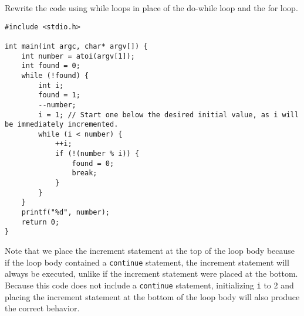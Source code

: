 Rewrite the code using while loops in place of the do-while loop and the for loop.

\begin{answer}
\begin{verbatim}
#include <stdio.h>

int main(int argc, char* argv[]) {
    int number = atoi(argv[1]);
    int found = 0;
    while (!found) {
        int i; 
        found = 1;
        --number;
        i = 1; // Start one below the desired initial value, as i will be immediately incremented.
        while (i < number) {
            ++i;
            if (!(number % i)) {
                found = 0;
                break;
            }
        }
    }
    printf("%d", number);
    return 0;
}
\end{verbatim}

Note that we place the increment statement at the top of the loop body because if the loop body contained a \texttt{continue} statement, the increment statement will always be executed, unlike if the increment statement were placed at the bottom. Because this code does not include a \texttt{continue} statement, initializing \texttt{i} to 2 and placing the increment statement at the bottom of the loop body will also produce the correct behavior.
\end{answer}